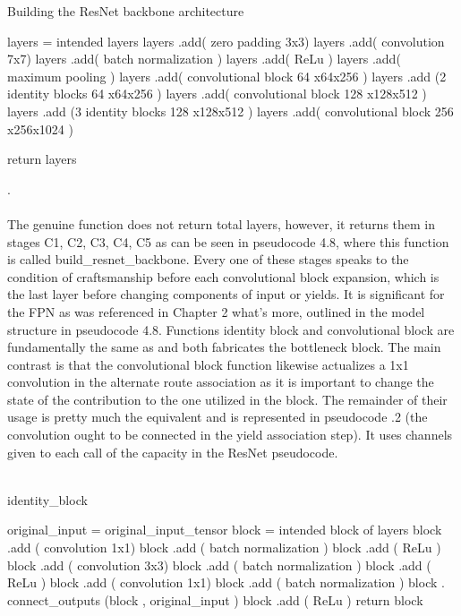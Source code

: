  \begin{algorithm}[H]
  \caption{Building the ResNet backbone architecture}
  \SetAlgoLined
  \DontPrintSemicolon
 layers = intended layers\;
 layers .add( zero padding 3x3)\;
 layers .add( convolution 7x7)\;   
 layers .add( batch normalization )\;
 layers .add( ReLu )\;
 layers .add( maximum pooling )\;
 layers .add( convolutional block 64 x64x256 )\;
 layers .add (2 identity blocks 64 x64x256 )\;
 layers .add( convolutional block 128 x128x512 )\;
 layers .add (3 identity blocks 128 x128x512 )\;
 layers .add( convolutional block 256 x256x1024 )\;


return layers\;   
 \end{algorithm}
.\\
\\
The genuine function does not return total layers, however, it returns them in stages  C1, C2, C3, C4, C5 as can be seen in pseudocode 4.8, where this function is called  build\_resnet\_backbone. Every one of these stages speaks to the condition of craftsmanship before each convolutional block expansion, which is the last layer before changing components of input or yields. It is significant for the FPN as was referenced in Chapter 2 what's more, outlined in the model structure in pseudocode 4.8. Functions identity block and convolutional block are fundamentally the same as and both fabricates the bottleneck block. The main contrast is that the convolutional block function likewise actualizes a 1x1 convolution in the alternate route association as it is important to change the state of the contribution to the one utilized in the block. The remainder of their usage is pretty much the equivalent and is represented in pseudocode .2 (the convolution ought to be connected in the yield association step). It uses channels given to each call of the capacity in the ResNet pseudocode.
\\
\\
\begin{algorithm}[H]
  \caption{identity\_block}
  \SetAlgoLined
  \DontPrintSemicolon
  original\_input = original\_input\_tensor\;
  block = intended block of layers\;
   block .add ( convolution 1x1)\;
   block .add ( batch normalization )\;
   block .add ( ReLu )\;
   block .add ( convolution 3x3)\;
   block .add ( batch normalization )\;
   block .add ( ReLu )\;
   block .add ( convolution 1x1)\;
    block .add ( batch normalization )\;
   block . connect\_outputs (block , original\_input )\;
   block .add ( ReLu )\;
   return block\;
  
  \end{algorithm}
